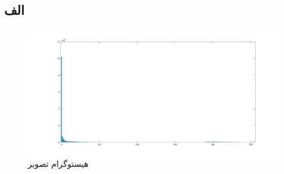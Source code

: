 \documentclass{article}
\begin{document}
\section{}%
\subsection{الف}
\subsubsection{}
\begin{latin}

\end{latin}
\subsubsection{}
\begin{latin}

\end{latin}
\begin{figure}[H]
    \centering
    \includegraphics[width=1\textwidth]{figures/6a.jpg}
    \caption
	{
هیستوگرام تصویر 
	}
    \label{fig:fig1}
\end{figure}
\end{document}
